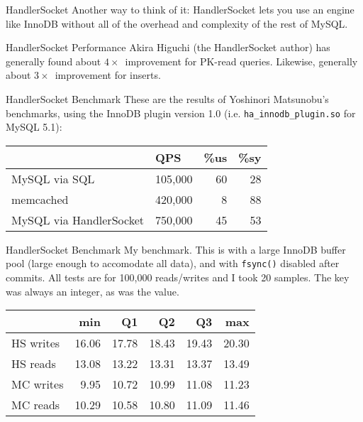 \documentclass[14pt]{beamer}
\begin{document}
\begin{frame}{HandlerSocket}
  Another way to think of it: HandlerSocket lets you use an engine like InnoDB
  without all of the overhead and complexity of the rest of MySQL.
\end{frame}

\begin{frame}{HandlerSocket Performance}
  Akira Higuchi (the HandlerSocket author) has generally found about
  $4\times$~improvement for PK-read queries.
  \newline
  \newline
  Likewise, generally about $3\times$~improvement for inserts.
\end{frame}

\begin{frame}{HandlerSocket Benchmark}
  These are the results of Yoshinori Matsunobu's benchmarks, using the InnoDB
  plugin version 1.0 (i.e. \texttt{ha\_innodb\_plugin.so} for MySQL 5.1):
  \begin{table}[ht]
    \begin{tabular}{l l r r}
                              & QPS     & \%us & \%sy \\ \hline
      MySQL via SQL           & 105,000 & 60   & 28   \\
      memcached               & 420,000 & 8    & 88   \\
      MySQL via HandlerSocket & 750,000 & 45   & 53   \\
    \end{tabular}
  \end{table}
\end{frame}

\begin{frame}{HandlerSocket Benchmark}
  My benchmark. This is with a large InnoDB buffer pool (large enough to
  accomodate all data), and with \texttt{fsync()} disabled after commits. All
  tests are for 100,000 reads/writes and I took 20 samples. The key was always
  an integer, as was the value.

  \begin{tabular}{l r r r r r}
                      & min   & Q1    & Q2    & Q3    & max   \\ \hline
    HS writes         & 16.06 & 17.78 & 18.43 & 19.43 & 20.30 \\
    HS reads          & 13.08 & 13.22 & 13.31 & 13.37 & 13.49 \\
    MC writes         &  9.95 & 10.72 & 10.99 & 11.08 & 11.23 \\
    MC reads          & 10.29 & 10.58 & 10.80 & 11.09 & 11.46 \\
  \end{tabular}
\end{frame}
\end{document}
